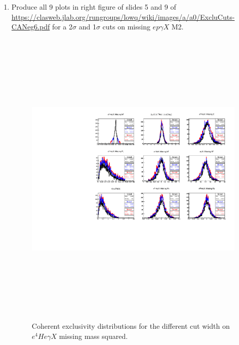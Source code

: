 \begin{enumerate}
\begin{enumerate}
\begin{enumerate}
  \item Produce all 9 plots in right figure of slides 5 and 9 of \url{ 
     https://clasweb.jlab.org/rungroups/lowq/wiki/images/a/a0/ExcluCuts-CANeg6.pdf}   
     for a 2$\sigma$ and 1$\sigma$ cuts on missing $ep\gamma X$ M2.
    \begin{figure}[tbp]
    \includegraphics[height=14.6cm]{fig/all_sigmas_coh_exc_cuts.pdf}
    \caption{Coherent exclusivity distributions for the different cut 
    width on $e^{4}He\gamma X$ missing mass squared. }
    \label{fig:2d_delta_phi_MM2_InCoh}
    \end{figure}                                                                  
    \begin{figure}[tbp]

\end{figure}
\end{enumerate}
\end{enumerate}
\end{enumerate}
